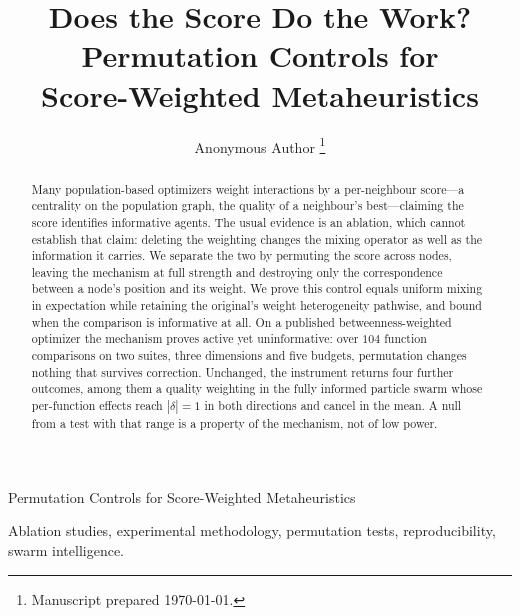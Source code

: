 \documentclass[lettersize,journal]{IEEEtran}
\begin{document}
\title{Does the Score Do the Work? Permutation Controls for\\
Score-Weighted Metaheuristics}

\author{Anonymous Author%
\thanks{Manuscript prepared \today.}}

%
{Permutation Controls for Score-Weighted Metaheuristics}

\maketitle

\begin{abstract}
Many population-based optimizers weight interactions by a per-neighbour
score---a centrality on the population graph, the quality of a neighbour's
best---claiming the score identifies informative agents. The usual evidence is
an ablation, which cannot establish that claim: deleting the weighting changes
the mixing operator as well as the information it carries. We separate the two
by permuting the score across nodes, leaving the mechanism at full strength and
destroying only the correspondence between a node's position and its weight. We
prove this control equals uniform mixing in expectation while retaining the
original's weight heterogeneity pathwise, and bound when the comparison is
informative at all. On a published betweenness-weighted optimizer the mechanism
proves active yet uninformative: over $104$ function comparisons on two suites,
three dimensions and five budgets, permutation changes nothing that survives
correction. Unchanged, the instrument returns four further outcomes, among them
a quality weighting in the fully informed particle swarm whose per-function
effects reach $|\delta|=1$ in both directions and cancel in the mean. A null
from a test with that range is a property of the mechanism, not of low power.
\end{abstract}

\begin{IEEEkeywords}
Ablation studies, experimental methodology, permutation tests, reproducibility,
swarm intelligence.
\end{IEEEkeywords}

\IEEEpeerreviewmaketitle







\end{document}
